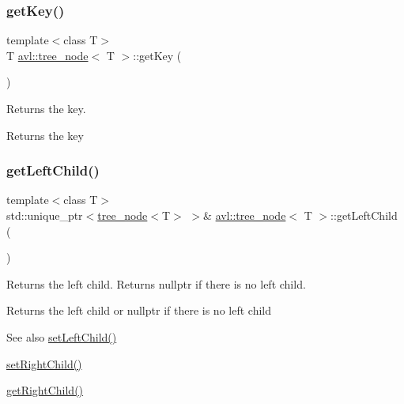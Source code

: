 \subsubsection{\texorpdfstring{get\+Key()}{getKey()}}
{\footnotesize\ttfamily template$<$class T$>$ \\
T \hyperlink{classavl_1_1tree__node}{avl\+::tree\+\_\+node}$<$ T $>$\+::get\+Key (\begin{DoxyParamCaption}{ }\end{DoxyParamCaption})\hspace{0.3cm}{\ttfamily [inline]}}

Returns the key. \begin{DoxyReturn}{Returns}
the key 
\end{DoxyReturn}
\mbox{\label{classavl_1_1tree__node_ad12a5f6a41cfc6203913c5b6bce30837}} 
\subsubsection{\texorpdfstring{get\+Left\+Child()}{getLeftChild()}}
{\footnotesize\ttfamily template$<$class T$>$ \\
std\+::unique\+\_\+ptr$<$\hyperlink{classavl_1_1tree__node}{tree\+\_\+node}$<$T$>$ $>$\& \hyperlink{classavl_1_1tree__node}{avl\+::tree\+\_\+node}$<$ T $>$\+::get\+Left\+Child (\begin{DoxyParamCaption}{ }\end{DoxyParamCaption})\hspace{0.3cm}{\ttfamily [inline]}}

Returns the left child. Returns nullptr if there is no left child. \begin{DoxyReturn}{Returns}
the left child or nullptr if there is no left child 
\end{DoxyReturn}
\begin{DoxySeeAlso}{See also}
\hyperlink{classavl_1_1tree__node_acb0fbbc7cca1f2b18e72fb728be23979}{set\+Left\+Child()} 

\hyperlink{classavl_1_1tree__node_a8b36f21d28a09858e32ba9f1b349994f}{set\+Right\+Child()} 

\hyperlink{classavl_1_1tree__node_ac79592e64351573e622d0977002fc813}{get\+Right\+Child()} 
\end{DoxySeeAlso}
\mbox{\label{classavl_1_1tree__node_a47e9411fcd44d4ea5b8403e1ae757060}} 
